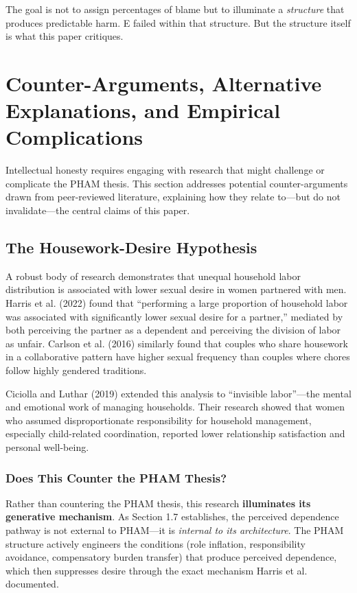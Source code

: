 \documentclass[12pt,openany]{book}
\numberwithin{equation}{chapter}
\begin{document}
The goal is not to assign percentages of blame but to illuminate a \textit{structure} that produces predictable harm. E failed within that structure. But the structure itself is what this paper critiques.

\chapter{Counter-Arguments, Alternative Explanations, and Empirical Complications}

Intellectual honesty requires engaging with research that might challenge or complicate the PHAM thesis. This section addresses potential counter-arguments drawn from peer-reviewed literature, explaining how they relate to---but do not invalidate---the central claims of this paper.

\section{The Housework-Desire Hypothesis}

A robust body of research demonstrates that unequal household labor distribution is associated with lower sexual desire in women partnered with men. Harris et al. (2022) found that ``performing a large proportion of household labor was associated with significantly lower sexual desire for a partner,'' mediated by both perceiving the partner as a dependent and perceiving the division of labor as unfair. Carlson et al. (2016) similarly found that couples who share housework in a collaborative pattern have higher sexual frequency than couples where chores follow highly gendered traditions.

Ciciolla and Luthar (2019) extended this analysis to ``invisible labor''---the mental and emotional work of managing households. Their research showed that women who assumed disproportionate responsibility for household management, especially child-related coordination, reported lower relationship satisfaction and personal well-being.

\subsection{Does This Counter the PHAM Thesis?}

Rather than countering the PHAM thesis, this research \textbf{illuminates its generative mechanism}. As Section 1.7 establishes, the perceived dependence pathway is not external to PHAM---it is \textit{internal to its architecture}. The PHAM structure actively engineers the conditions (role inflation, responsibility avoidance, compensatory burden transfer) that produce perceived dependence, which then suppresses desire through the exact mechanism Harris et al. documented.
\end{document}
